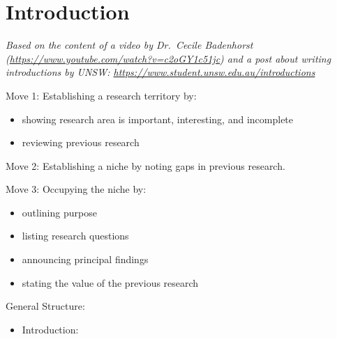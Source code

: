 \chapter{Introduction}
\label{chap:introduction}

\begin{writingdirectives}

      \item \textit{Based on the content of a video by Dr.\ Cecile Badenhorst
            (\url{https://www.youtube.com/watch?v=c2oGY1c51jc}) and a post about
            writing introductions by UNSW:
            \url{https://www.student.unsw.edu.au/introductions}}

      \item Move 1: Establishing a research territory by:
      \begin{itemize}

            \item showing research area is important, interesting, and
                  incomplete

            \item reviewing previous research

      \end{itemize}

      \item Move 2: Establishing a niche by noting gaps in previous research.

      \item Move 3: Occupying the niche by:
      \begin{itemize}

            \item outlining purpose

            \item listing research questions

            \item announcing principal findings

            \item stating the value of the previous research

      \end{itemize}

      \item General Structure:
      \begin{itemize}

            \item Introduction:
                  \begin{itemize}


\end{itemize}
\end{itemize}
\end{writingdirectives}

